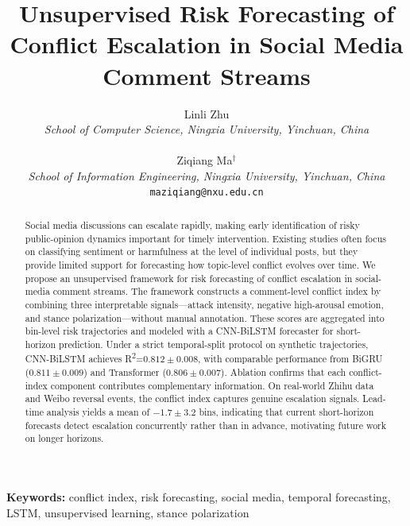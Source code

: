 \documentclass[11pt,a4paper]{article}
\begin{document}
\title{\huge Unsupervised Risk Forecasting of Conflict Escalation in Social Media Comment Streams}

\author{
Linli Zhu\\
\textit{School of Computer Science, Ningxia University, Yinchuan, China}\\\\
Ziqiang Ma$^\dagger$\\
\textit{School of Information Engineering, Ningxia University, Yinchuan, China}\\
\texttt{maziqiang@nxu.edu.cn}
}
\date{}

\maketitle

\begin{abstract}
Social media discussions can escalate rapidly, making early identification of risky public-opinion dynamics important for timely intervention. Existing studies often focus on classifying sentiment or harmfulness at the level of individual posts, but they provide limited support for forecasting how topic-level conflict evolves over time. We propose an unsupervised framework for risk forecasting of conflict escalation in social-media comment streams. The framework constructs a comment-level conflict index by combining three interpretable signals---attack intensity, negative high-arousal emotion, and stance polarization---without manual annotation. These scores are aggregated into bin-level risk trajectories and modeled with a CNN-BiLSTM forecaster for short-horizon prediction. Under a strict temporal-split protocol on synthetic trajectories, CNN-BiLSTM achieves R\textsuperscript{2}=$0.812\pm0.008$, with comparable performance from BiGRU ($0.811\pm0.009$) and Transformer ($0.806\pm0.007$). Ablation confirms that each conflict-index component contributes complementary information. On real-world Zhihu data and Weibo reversal events, the conflict index captures genuine escalation signals. Lead-time analysis yields a mean of $-1.7\pm3.2$ bins, indicating that current short-horizon forecasts detect escalation concurrently rather than in advance, motivating future work on longer horizons.
\end{abstract}

\noindent\textbf{Keywords:} conflict index, risk forecasting, social media, temporal forecasting, LSTM, unsupervised learning, stance polarization

\vspace{5mm}
\end{document}
